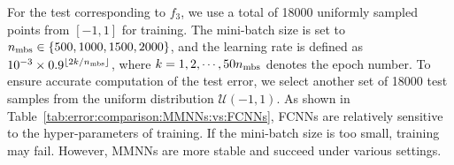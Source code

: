 \documentclass[11pt,a4paper]{article}
\let\dots\cdots
\begin{document}
For the test corresponding to \( f_3 \), we use a total of 18000 uniformly sampled points from \( [-1,1] \) for training. The mini-batch size is set to \( n_{\textnormal{mbs}} \in \{500, 1000, 1500, 2000\} \), and the learning rate is defined as \( 10^{-3} \times 0.9^{\lfloor 2k/n_{\textnormal{mbs}} \rfloor} \), where \( k = 1,2,\dots,50n_{\tn{mbs}} \) denotes the epoch number. 
To ensure accurate computation of the test error, we select another set of 18000 test samples from the uniform distribution \( \mathcal{U}(-1,1) \).
As shown in Table~\ref{tab:error:comparison:MMNNs:vs:FCNNs}, FCNNs are relatively sensitive to the hyper-parameters of training. If the mini-batch size is too small, training may fail. However, MMNNs are more stable and succeed under various settings.









\end{document}
